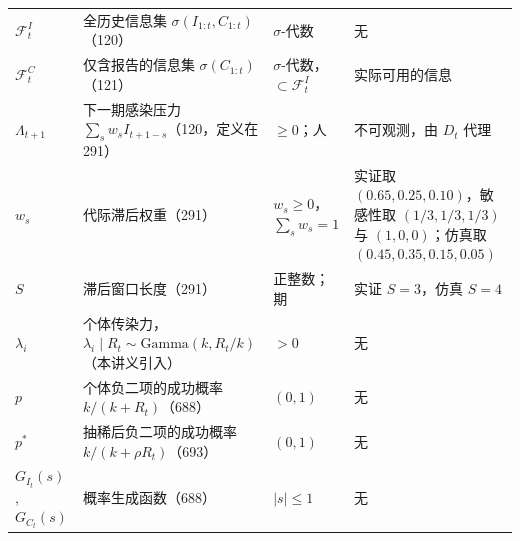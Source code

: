 \begin{table}[!tbp]
\begin{tabular}{L{1.7cm}L{5.8cm}L{3.0cm}L{4.4cm}}
$\mathcal F_t^I$ & 全历史信息集 $\sigma(I_{1:t},C_{1:t})$（120） & $\sigma$-代数 & 无 \\
$\mathcal F_t^C$ & 仅含报告的信息集 $\sigma(C_{1:t})$（121） & $\sigma$-代数，$\subset\mathcal F_t^I$ & 实际可用的信息 \\
$\Lambda_{t+1}$ & 下一期感染压力 $\sum_sw_sI_{t+1-s}$（120，定义在 291） & $\ge0$；人 & 不可观测，由 $D_t$ 代理 \\
$w_s$ & 代际滞后权重（291） & $w_s\ge0$，$\sum_sw_s=1$ & 实证取 $(0.65,0.25,0.10)$，敏感性取 $(1/3,1/3,1/3)$ 与 $(1,0,0)$；仿真取 $(0.45,0.35,0.15,0.05)$ \\
$S$ & 滞后窗口长度（291） & 正整数；期 & 实证 $S=3$，仿真 $S=4$ \\
$\lambda_i$ & 个体传染力，$\lambda_i\mid R_t\sim\mathrm{Gamma}(k,R_t/k)$（本讲义引入） & $>0$ & 无 \\
$p$ & 个体负二项的成功概率 $k/(k+R_t)$（688） & $(0,1)$ & 无 \\
$p^*$ & 抽稀后负二项的成功概率 $k/(k+\rho R_t)$（693） & $(0,1)$ & 无 \\
$G_{I_t}(s)$, $G_{C_t}(s)$ & 概率生成函数（688） & $\lvert s\rvert\le1$ & 无 \\
\bottomrule
\end{tabular}
\end{table}

